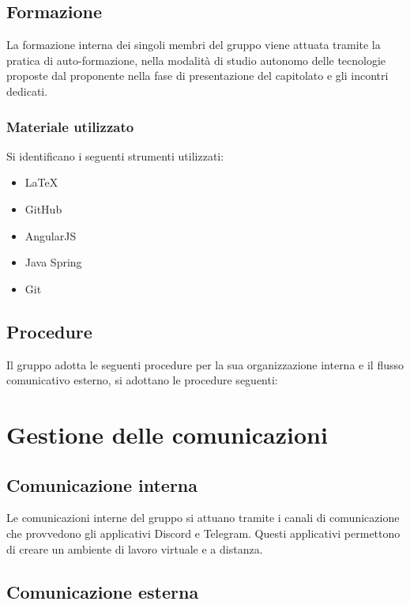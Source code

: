 \subsection{Formazione}

La formazione interna dei singoli membri del gruppo viene attuata tramite la pratica di auto-formazione, nella modalità di studio autonomo delle tecnologie proposte dal proponente nella fase di presentazione del capitolato e gli incontri dedicati.

\subsubsection{Materiale utilizzato}

Si identificano i seguenti strumenti utilizzati:

\begin{itemize}
\item LaTeX
\item GitHub
\item AngularJS
\item Java Spring
\item Git
\end{itemize}

\subsection{Procedure}

Il gruppo adotta le seguenti procedure per la sua organizzazione interna e il flusso comunicativo esterno, si adottano le procedure seguenti:

\section{Gestione delle comunicazioni}

\subsection{Comunicazione interna}

Le comunicazioni interne del gruppo si attuano tramite i canali di comunicazione che provvedono gli applicativi Discord e Telegram. Questi applicativi permettono di creare un ambiente di lavoro virtuale e a distanza.

\subsection{Comunicazione esterna}

